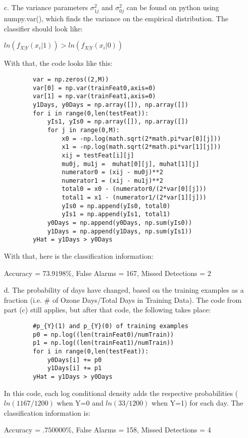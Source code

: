 \documentclass{article}
\begin{document}
\begin{enumerate}
	\item[c.] The variance parameters $\sigma_{1j}^2$ and $\sigma_{0j}^2$ can be found on python using numpy.var(), which finds the variance on the empirical distribution. The classifier
	should look like:
	\begin{center}
		$ln (f_{X|Y}(x_{i}| 1)) > ln(f_{X|Y}(x_{i} | 0))$
	\end{center}	
	With that, the code looks like this: 
	\begin{verbatim}
		var = np.zeros((2,M))
		var[0] = np.var(trainFeat0,axis=0)
		var[1] = np.var(trainFeat1,axis=0)
		y1Days, y0Days = np.array([]), np.array([])
		for i in range(0,len(testFeat)):
		    yIs1, yIs0 = np.array([]), np.array([])
		    for j in range(0,M):
		        x0 = -np.log(math.sqrt(2*math.pi*var[0][j]))
		        x1 = -np.log(math.sqrt(2*math.pi*var[1][j]))
		        xij = testFeat[i][j]
		        mu0j, mu1j =  muhat[0][j], muhat[1][j]
		        numerator0 = (xij - mu0j)**2
		        numerator1 = (xij - mu1j)**2
		        total0 = x0 - (numerator0/(2*var[0][j]))
		        total1 = x1 - (numerator1/(2*var[1][j]))
		        yIs0 = np.append(yIs0, total0)
		        yIs1 = np.append(yIs1, total1)
		    y0Days = np.append(y0Days, np.sum(yIs0))
		    y1Days = np.append(y1Days, np.sum(yIs1))
		yHat = y1Days > y0Days
	\end{verbatim}
	With that, here is the classification information: 
	\begin{center}
		Accuracy = $73.9198\%$,
		False Alarms = 167, 
		Missed Detections = 2
	\end{center}
	
	\item[d.] The probability of days have changed, based on the training examples as a fraction (i.e. \# of Ozone Days/Total Days in Training Data). The code from part (c) still applies, but 
	after that code, the following takes place: 
	\begin{verbatim}
		#p_{Y}(1) and p_{Y}(0) of training examples
		p0 = np.log((len(trainFeat0)/numTrain))
		p1 = np.log((len(trainFeat1)/numTrain))
		for i in range(0,len(testFeat)):
		    y0Days[i] += p0
		    y1Days[i] += p1
		yHat = y1Days > y0Days
	\end{verbatim}
	In this code, each log conditional density adds the respective probabilities ($ln(1167/1200)$ when Y=0 and $ ln(33/1200)$ when Y=1) for each day. The classification information is:
	\begin{center}
		Accuracy = $.750000\%$,
		False Alarms = 158,
		Missed Detections = 4
	\end{center}
\end{enumerate}
\end{document}
